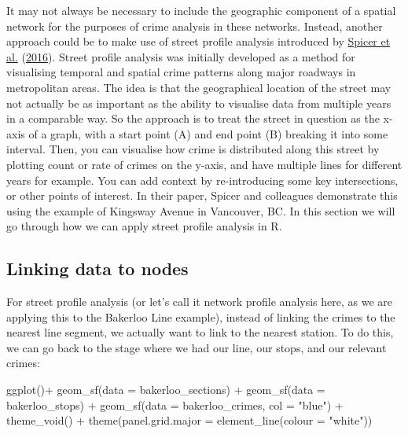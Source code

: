 \documentclass[
  krantz2]{krantz}
\makeatletter
\newenvironment{Shaded}{\begin{snugshade}}{\end{snugshade}}
\newcommand{\AttributeTok}[1]{\textcolor[rgb]{0.61,0.61,0.61}{#1}}
\newcommand{\FunctionTok}[1]{\textcolor[rgb]{0,0,0}{#1}}
\newcommand{\NormalTok}[1]{#1}
\newcommand{\SpecialCharTok}[1]{\textcolor[rgb]{0,0,0}{#1}}
\newcommand{\StringTok}[1]{\textcolor[rgb]{0.5,0.5,0.5}{#1}}
\newenvironment{kframe}{%
\medskip{}
\setlength{\fboxsep}{.8em}
 \def\at@end@of@kframe{}%
 \ifinner\ifhmode%
  \def\at@end@of@kframe{\end{minipage}}%
  \begin{minipage}{\columnwidth}%
 \fi\fi%
 \def\FrameCommand##1{\hskip\@totalleftmargin \hskip-\fboxsep
 \colorbox{shadecolor}{##1}\hskip-\fboxsep
     \hskip-\linewidth \hskip-\@totalleftmargin \hskip\columnwidth}%
 \MakeFramed {\advance\hsize-\width
   \@totalleftmargin\z@ \linewidth\hsize
   \@setminipage}}%
 {\par\unskip\endMakeFramed%
 \at@end@of@kframe}
\renewenvironment{Shaded}{\begin{kframe}}{\end{kframe}}
\makeatother
\begin{document}
It may not always be necessary to include the geographic component of a spatial network for the purposes of crime analysis in these networks. Instead, another approach could be to make use of street profile analysis introduced by \protect\hyperlink{ref-Spicer_2016}{Spicer et al.} (\protect\hyperlink{ref-Spicer_2016}{2016}). Street profile analysis was initially developed as a method for visualising temporal and spatial crime patterns along major roadways in metropolitan areas. The idea is that the geographical location of the street may not actually be as important as the ability to visualise data from multiple years in a comparable way. So the approach is to treat the street in question as the x-axis of a graph, with a start point (A) and end point (B) breaking it into some interval. Then, you can visualise how crime is distributed along this street by plotting count or rate of crimes on the y-axis, and have multiple lines for different years for example. You can add context by re-introducing some key intersections, or other points of interest. In their paper, Spicer and colleagues demonstrate this using the example of Kingsway Avenue in Vancouver, BC. In this section we will go through how we can apply street profile analysis in R.

\hypertarget{linking-data-to-nodes}{%
\subsection{Linking data to nodes}\label{linking-data-to-nodes}}

For street profile analysis (or let's call it network profile analysis here, as we are applying this to the Bakerloo Line example), instead of linking the crimes to the nearest line segment, we actually want to link to the nearest station. To do this, we can go back to the stage where we had our line, our stops, and our relevant crimes:

\begin{Shaded}
\begin{Highlighting}[]
\FunctionTok{ggplot}\NormalTok{()}\SpecialCharTok{+} 
  \FunctionTok{geom\_sf}\NormalTok{(}\AttributeTok{data =}\NormalTok{ bakerloo\_sections) }\SpecialCharTok{+} 
  \FunctionTok{geom\_sf}\NormalTok{(}\AttributeTok{data =}\NormalTok{ bakerloo\_stops) }\SpecialCharTok{+} 
  \FunctionTok{geom\_sf}\NormalTok{(}\AttributeTok{data =}\NormalTok{ bakerloo\_crimes, }\AttributeTok{col =} \StringTok{"blue"}\NormalTok{) }\SpecialCharTok{+} 
  \FunctionTok{theme\_void}\NormalTok{() }\SpecialCharTok{+} 
  \FunctionTok{theme}\NormalTok{(}\AttributeTok{panel.grid.major =} \FunctionTok{element\_line}\NormalTok{(}\AttributeTok{colour =} \StringTok{"white"}\NormalTok{))}
\end{Highlighting}
\end{Shaded}
\end{document}
